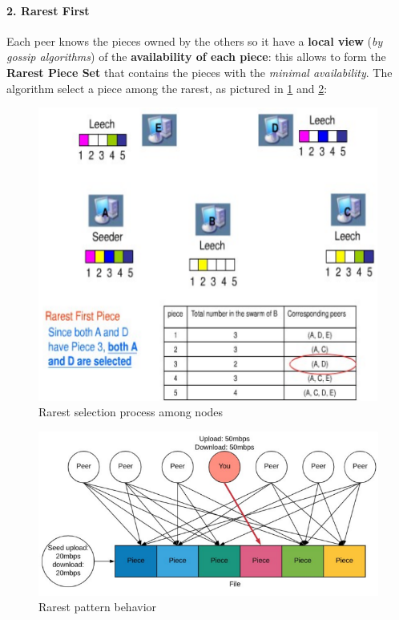 \documentclass[10pt,a4paper]{report}
\begin{document}
\paragraph{2. Rarest First}\label{sec:2-rarest-first}
Each peer knows the pieces owned by the others so it have a \textbf{local view} (\textit{by gossip algorithms}) of the \textbf{availability of each piece}: this allows to form the \textbf{Rarest Piece Set}  that contains the pieces with the \textit{minimal availability}.
The algorithm select a piece among the rarest, as pictured in \ref{rarest1} and \ref{rarest2}:
\begin{figure}[b!]
	\centering
	\includegraphics[scale=0.60]{images/Pasted image 20230311101518.png}
	\caption{Rarest selection process among nodes}
	\label{rarest1}
\end{figure}


\begin{figure}
	\centering
	\includegraphics[scale=0.50]{images/Pasted image 20230311101953.png}
	\caption{Rarest pattern behavior}
	\label{rarest2}
\end{figure}
\end{document}
